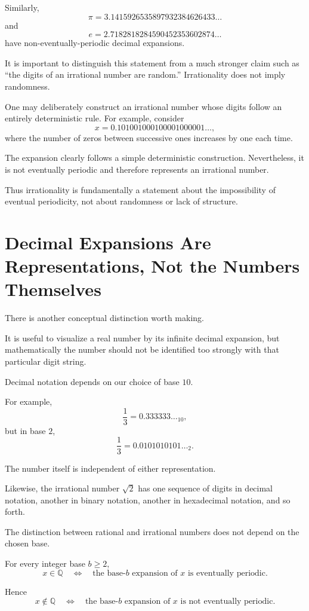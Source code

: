 \documentclass{essay}
\begin{document}
Similarly,
\[
\pi
=
3.1415926535897932384626433\ldots
\]
and
\[
e
=
2.7182818284590452353602874\ldots
\]
have non-eventually-periodic decimal expansions.

It is important to distinguish this statement from a much stronger claim such as ``the digits of an irrational number are random.'' Irrationality does not imply randomness.

One may deliberately construct an irrational number whose digits follow an entirely deterministic rule. For example, consider
\[
x
=
0.101001000100001000001\ldots,
\]
where the number of zeros between successive ones increases by one each time.

The expansion clearly follows a simple deterministic construction. Nevertheless, it is not eventually periodic and therefore represents an irrational number.

Thus irrationality is fundamentally a statement about the impossibility of eventual periodicity, not about randomness or lack of structure.

\section{Decimal Expansions Are Representations, Not the Numbers Themselves}

There is another conceptual distinction worth making.

It is useful to visualize a real number by its infinite decimal expansion, but mathematically the number should not be identified too strongly with that particular digit string.

Decimal notation depends on our choice of base \(10\).

For example,
\[
\frac13
=
0.333333\ldots_{10},
\]
but in base \(2\),
\[
\frac13
=
0.0101010101\ldots_2.
\]

The number itself is independent of either representation.

Likewise, the irrational number \(\sqrt{2}\) has one sequence of digits in decimal notation, another in binary notation, another in hexadecimal notation, and so forth.

The distinction between rational and irrational numbers does not depend on the chosen base.

For every integer base \(b\geq2\),
\[
x\in\mathbb{Q}
\quad\Longleftrightarrow\quad
\text{the base-\(b\) expansion of \(x\) is eventually periodic}.
\]

Hence
\[
x\notin\mathbb{Q}
\quad\Longleftrightarrow\quad
\text{the base-\(b\) expansion of \(x\) is not eventually periodic}.
\]
\end{document}
